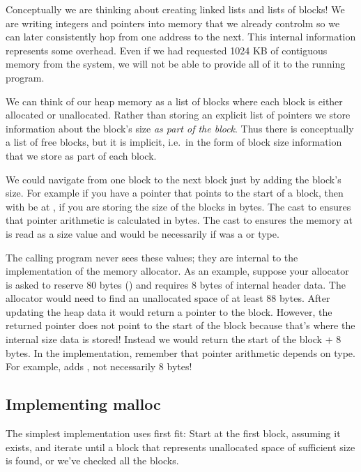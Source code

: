 Conceptually we are thinking about creating linked lists and lists of blocks! We are writing integers and pointers into memory that we already controlm so we can later consistently hop from one address to the next. This internal information represents some overhead. Even if we had requested 1024 KB of contiguous memory from the system, we will not be able to provide all of it to the running program.

We can think of our heap memory as a list of blocks where each block is either allocated or unallocated. Rather than storing an explicit list of pointers we store information about the block's size \emph{as part of the block}. Thus there is conceptually a list of free blocks, but it is implicit, i.e.~in the form of block size information that we store as part of each block.

We could navigate from one block to the next block just by adding the block's size. For example if you have a pointer  that points to the start of a block, then  with be at , if you are storing the size of the blocks in bytes. The cast to  ensures that pointer arithmetic is calculated in bytes. The cast to  ensures the memory at  is read as a size value and would be necessarily if  was a  or  type.

The calling program never sees these values; they are internal to the implementation of the memory allocator. As an example, suppose your allocator is asked to reserve 80 bytes () and requires 8 bytes of internal header data. The allocator would need to find an unallocated space of at least 88 bytes. After updating the heap data it would return a pointer to the block. However, the returned pointer does not point to the start of the block because that's where the internal size data is stored! Instead we would return the start of the block + 8 bytes. In the implementation, remember that pointer arithmetic depends on type. For example,  adds , not necessarily 8 bytes!

\subsection{Implementing malloc}

The simplest implementation uses first fit: Start at the first block, assuming it exists, and iterate until a block that represents unallocated space of sufficient size is found, or we've checked all the blocks.

